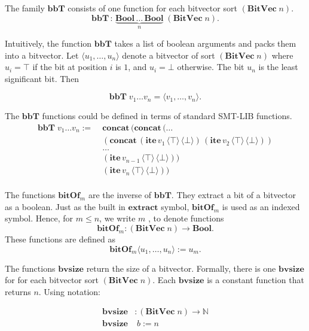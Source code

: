 \documentclass{scrartcl}
\newcommand\lsymb[1]{\mathbf{#1}}
\theoremstyle{definition}
\begin{document}
The family $\lsymb{bbT}$ consists of one function for each bitvector sort
$(\lsymb{BitVec}\;n)$.
\[
\lsymb{bbT}\,:\,\underbrace{\lsymb{Bool}\,\dots\,\lsymb{Bool}}_n\;(\lsymb{BitVec}\;n).
\]

\noindent
Intuitively, the function $\lsymb{bbT}$ takes a list of boolean arguments and
packs them into a bitvector.
Let $\langle u_1, \dots, u_n\rangle$ denote a bitvector of sort $(\lsymb{BitVec}\;n)$
where $u_i = \top$ if the bit at position $i$ is $1$, and $u_i = \bot$ otherwise.
The bit $u_n$ is the least significant bit.  Then

\[
\lsymb{bbT}\; v_1 \dots v_n = \langle v_1, \dots, v_n\rangle .
\]

\noindent
The $\lsymb{bbT}$ functions could be defined in terms of standard SMT-LIB functions.
\begin{align*}
\lsymb{bbT}\;v_1 \dots v_n :=\;
 &\lsymb{concat}\,(\lsymb{concat}\,(\dots \\
 &(\lsymb{concat}\,(\lsymb{ite}\,v_1\,\langle\top\rangle\,\langle\bot\rangle)\,(\lsymb{ite}\,v_2\,\langle\top\rangle\,\langle\bot\rangle))\\
 & \dots \\
 & (\lsymb{ite}\,v_{n-1}\,\langle\top\rangle\,\langle\bot\rangle)) \\
 & (\lsymb{ite}\,v_n\,\langle\top\rangle\,\langle\bot\rangle)) \\
\end{align*}

\noindent
The functions $\lsymb{bitOf}_m$ are the inverse of $\lsymb{bbT}$.  They extract
a bit of a bitvector as a boolean.  Just as the built in $\lsymb{extract}$
symbol, $\lsymb{bitOf}_m$ is used as an indexed symbol.  Hence, for $m \leq n$, we
write  $m$ \inlineAlethe{)}, to denote functions
\[
\lsymb{bitOf}_m : (\lsymb{BitVec}\;n) \to \lsymb{Bool}.
\]
These functions are defined as 
\[
\lsymb{bitOf}_m \langle u_1, \dots, u_n \rangle := u_m.
\]


\noindent
The functions $\lsymb{bvsize}$ return the size of a bitvector.  Formally, there
is one $\lsymb{bvsize}$ for for each bitvector sort $(\lsymb{BitVec}\;n)$.  Each
$\lsymb{bvsize}$ is a constant function that returns $n$.  Using notation:

\begin{align*}
\lsymb{bvsize}& : (\lsymb{BitVec}\;n) \to \mathbb{N}\\
\lsymb{bvsize}&\;b := n
\end{align*}
\end{document}
